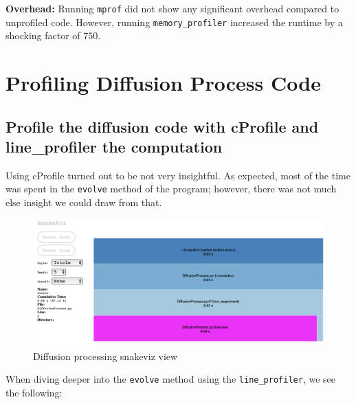 \documentclass[a4paper,12pt]{article}
\begin{document}
\textbf{Overhead:}
Running \verb|mprof| did not show any significant overhead compared to unprofiled code.
However, running \verb|memory_profiler| increased the runtime by a shocking factor of $750$.

\newpage
\section{Profiling Diffusion Process Code}
\subsection{Profile the diffusion code with cProfile and line\_profiler the computation}

Using cProfile turned out to be not very insightful.
As expected, most of the time was spent in the \verb|evolve| method of the program; however, there was not much else insight we could draw from that.

\begin{figure}[h!]
  \centering
  \includegraphics[width=\textwidth]{images/diffusion_snakeviz_view}
  \caption{Diffusion processing snakeviz view}
  \label{fig:diffusion-snakeviz}
\end{figure}

When diving deeper into the \verb|evolve| method using the \verb|line_profiler|, we see the following:
\end{document}
